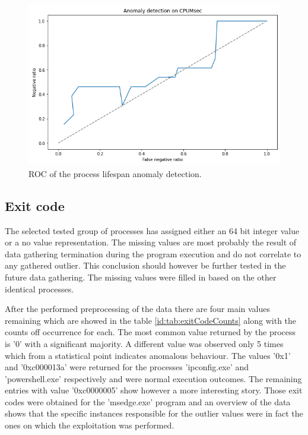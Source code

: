 \documentclass[a4paper,twoside,12pt]{book}
\begin{document}
\begin{figure}
	\centering
	\includegraphics[scale=0.9]{images/ROCCPUMsec}
	\caption{ROC of the process lifespan anomaly detection.}
	\label{fig:CPUMsecROC}
 \end{figure}

\subsection{Exit code}

The selected tested group of processes has assigned either an 64 bit integer value or a no value representation.
The missing values are most probably the result of data gathering termination during the program execution and
do not correlate to any gathered outlier. This conclusion should however be further tested in the future data gathering.
The missing values were filled in based on the other identical processes.

After the performed preprocessing of the data there are four main values remaining which are showed in the table \ref{id:tab:exitCodeCounts}
along with the counts off occurrence for each. The most common value returned by the process is '0' with a significant majority. A different 
value was observed only 5 times which from a statistical point indicates anomalous behaviour. The values '0x1' and '0xc000013a' were
returned for the processes 'ipconfig.exe' and 'powershell.exe' respectively and were normal execution outcomes. The remaining 
entries with value '0xc0000005' show however a more interesting story. Those exit codes were obtained for the 'msedge.exe' program
and an overview of the data shows that the specific instances responsible for the outlier values were in fact the ones on which the 
exploitation was performed. 
\end{document}
